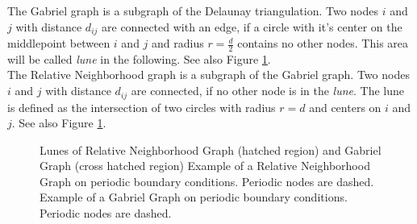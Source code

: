     The Gabriel graph \cite{Gabriel1969} is a subgraph of the
    Delaunay triangulation. Two nodes \(i\) and \(j\) with distance
    \(d_{ij}\) are connected with an edge, if a circle with it's
    center on the middlepoint between \(i\) and \(j\) and radius
    \(r = \frac d 2\) contains no other nodes. This area will be
    called \emph{lune} in the following. See also Figure
    \ref{fig:lunes}.\\
    The Relative Neighborhood graph \cite{Toussaint1980} is a
    subgraph of the Gabriel graph. Two nodes \(i\) and \(j\) with
    distance \(d_{ij}\) are connected, if no other node is in the
    \emph{lune}. The lune is defined as the intersection of two
    circles with radius \(r = d\) and centers on \(i\) and \(j\).
    See also Figure \ref{fig:lunes}.
    \begin{figure}[htbp]
        \centering
        \caption[Gabriel - and Relative Neighborhood Graph]
        {
             Lunes of Relative Neighborhood
                Graph (hatched region) and
                Gabriel Graph (cross hatched region)
             Example of a Relative
                Neighborhood Graph on periodic boundary conditions.
                Periodic nodes are dashed.
             Example of a Gabriel Graph on
                periodic boundary conditions. Periodic nodes are
                dashed.
        }
        \label{fig:lunes}
    \end{figure}\\
